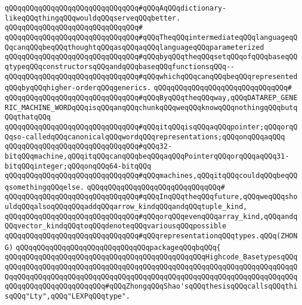 \verb|qQQqqQQqqQQqqQQqqQQqqQQqqQQqqQQq#qQQqAqQQqdictionary-likeqQQqthingqQQqwouldqQQqserveqQQqbetter.|\newline
\verb|qQQqqQQqqQQqqQQqqQQqqQQqqQQqqQQq#|\newline
\verb|qQQqqQQqqQQqqQQqqQQqqQQqqQQqqQQq#qQQqTheqQQqintermediateqQQqlanguageqQQqcanqQQqbeqQQqthoughtqQQqasqQQqaqQQqlanguageqQQqparameterized|\newline
\verb|qQQqqQQqqQQqqQQqqQQqqQQqqQQqqQQq#qQQqbyqQQqtheqQQqsetqQQqofqQQqbaseqQQqtypeqQQqconstructorsqQQqandqQQqbaseqQQqfunctionsqQQq--|\newline
\verb|qQQqqQQqqQQqqQQqqQQqqQQqqQQqqQQq#qQQqwhichqQQqcanqQQqbeqQQqrepresentedqQQqbyqQQqhigher-orderqQQqgenerics.|\newline
\verb|qQQqqQQqqQQqqQQqqQQqqQQqqQQqqQQq#|\newline
\verb|qQQqqQQqqQQqqQQqqQQqqQQqqQQqqQQq#qQQqByqQQqtheqQQqway,qQQqDATAREP_GENERIC_MACHINE_WORDqQQqisqQQqanqQQqchunkqQQqweqQQqknowqQQqnothingqQQqbutqQQqthatqQQq|\newline
\verb|qQQqqQQqqQQqqQQqqQQqqQQqqQQqqQQq#qQQqitqQQqisqQQqaqQQqpointer;qQQqorqQQqso-calledqQQqcanonicalqQQqwordqQQqrepresentations;qQQqonqQQqaqQQq|\newline
\verb|qQQqqQQqqQQqqQQqqQQqqQQqqQQqqQQq#qQQq32-bitqQQqmachine,qQQqitqQQqcanqQQqbeqQQqaqQQqPointerqQQqorqQQqaqQQq31-bitqQQqinteger;qQQqonqQQq64-bitqQQq|\newline
\verb|qQQqqQQqqQQqqQQqqQQqqQQqqQQqqQQq#qQQqmachines,qQQqitqQQqcouldqQQqbeqQQqsomethingqQQqelse.|\newline
\verb|qQQqqQQqqQQqqQQqqQQqqQQqqQQqqQQq#|\newline
\verb|qQQqqQQqqQQqqQQqqQQqqQQqqQQqqQQq#qQQqInqQQqtheqQQqfuture,qQQqweqQQqshouldqQQqalsoqQQqqQQqaddqQQqarrow_kindqQQqandqQQqtuple_kind,|\newline
\verb|qQQqqQQqqQQqqQQqqQQqqQQqqQQqqQQq#qQQqorqQQqevenqQQqarray_kind,qQQqandqQQqvector_kindqQQqtoqQQqdenoteqQQqvariousqQQqpossible|\newline
\verb|qQQqqQQqqQQqqQQqqQQqqQQqqQQqqQQq#qQQqrepresentationqQQqtypes.qQQq(ZHONG)|\newline
\newline
\verb|qQQqqQQqqQQqqQQqqQQqqQQqqQQqqQQqpackageqQQqbqQQq{|\newline
\verb|qQQqqQQqqQQqqQQqqQQqqQQqqQQqqQQqqQQqqQQqqQQqqQQqHighcode_BasetypesqQQqqQQqqQQqqQQqqQQqqQQqqQQqqQQqqQQqqQQqqQQqqQQqqQQqqQQqqQQqqQQqqQQqqQQqqQQqqQQqqQQqqQQqqQQqqQQqqQQqqQQqqQQqqQQqqQQqqQQqqQQqqQQqqQQqqQQqqQQqqQQqqQQqqQQqqQQqqQQqqQQqqQQq#qQQqZhongqQQqShao'sqQQqthesisqQQqcallsqQQqthisqQQq"Lty",qQQq"LEXPqQQqtype".|\newline
